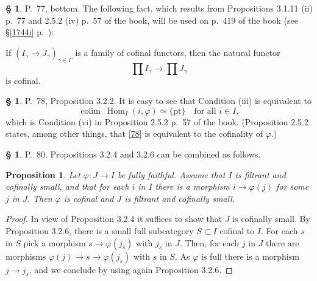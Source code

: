 \documentclass[12pt]{article}%
\newtheorem{prop}[thm]{Proposition}
\theoremstyle{remark}
\theoremstyle{definition}
\newtheorem{s}[thm]{\S}%
\newcommand{\pt}{\{\text{pt}\}}
\newcommand{\pp}{\varphi}
\DeclareMathOperator*{\colim}{colim}%
\DeclareMathOperator{\Hom}{Hom}%
\begin{document}
%

\begin{s}\label{poc}
P.~77, bottom. The following fact, which results from Propositions 3.1.11 (ii) p.~77 and 2.5.2 (iv) p.~57 of the book, will be used on p.~419 of the book (see \S\ref{1744i} p.~\pageref{1744i}):

If $(I_\gamma\to J_\gamma)_{\gamma\in\Gamma}$ is a family of cofinal functors, then the natural functor $$\prod I_\gamma\to\prod J_\gamma$$ is cofinal. 
\end{s}

%

\begin{s} 
P.~78, Proposition 3.2.2. It is easy to see that Condition (iii) is equivalent to
%
\begin{equation}\label{78} 
\colim\ \Hom_I(i,\pp)\simeq\pt\quad\text{for all }i\in I, 
\end{equation} 
%
which is Condition (vi) in Proposition 2.5.2 p.~57 of the book. (Proposition 2.5.2 states, among other things, that \eqref{78} is equivalent to the cofinality of $\pp$.)
\end{s}

%

\begin{s} 
P.~80. Propositions 3.2.4 and 3.2.6 can be combined as follows. 

\begin{prop}\label{comb}
Let $\pp:J\to I$ be fully faithful. Assume that $I$ is filtrant and cofinally small, and that for each $i$ in $I$ there is a morphism $i\to\pp(j)$ for some $j$ in $J$. Then $\pp$ is cofinal and $J$ is filtrant and cofinally small. 
\end{prop} 

\begin{proof}
In view of Proposition 3.2.4 it suffices to show that $J$ is cofinally small. By Proposition 3.2.6, there is a small full subcategory $S\subset I$ cofinal to $I$. For each $s$ in $S$ pick a morphism $s\to\pp(j_s)$ with $j_s$ in $J$. Then, for each $j$ in $J$ there are morphisms $\pp(j)\to s\to\pp(j_s)$ with $s$ in $S$. As $\pp$ is full there is a morphism $j\to j_s$, and we conclude by using again Proposition 3.2.6.
\end{proof}
\end{s}

%
\end{document}
